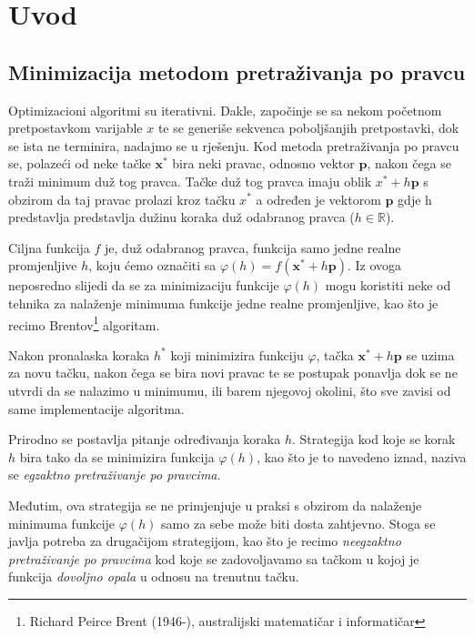 \documentclass[bosnian,12pt,a4paper]{report}
\begin{document}
\chapter{Uvod}
	\section{Minimizacija metodom pretraživanja po pravcu}
	
	\justify
	Optimizacioni algoritmi su iterativni. Dakle, započinje se sa nekom početnom pretpostavkom varijable $x$ te se generiše sekvenca poboljšanjih pretpostavki, dok se ista ne terminira, nadajmo se u rješenju. Kod metoda pretraživanja po pravcu se, polazeći od neke tačke $\textbf{x}^*$ bira neki pravac, odnosno vektor $\textbf{p}$, nakon čega se traži minimum duž tog pravca. 
	\justify
	Tačke duž tog pravca imaju oblik $x^* + h\textbf{p}$ s obzirom da taj pravac prolazi kroz tačku $x^*$ a određen je vektorom $\textbf{p}$ gdje h predstavlja predstavlja dužinu koraka duž odabranog pravca ($h \in \mathbb{R}$). 
	
	
	\justify
	Ciljna funkcija $f$ je, duž odabranog pravca, funkcija samo jedne realne promjenljive $h$, koju ćemo označiti sa $\varphi(h) = f(\textbf{x}^* + h\textbf{p})$. Iz ovoga neposredno slijedi da se za minimizaciju funkcije $\varphi(h)$ mogu koristiti neke od tehnika za nalaženje minimuma funkcije jedne realne promjenljive, kao što je recimo Brentov\footnote{Richard Peirce Brent (1946-), australijski matematičar i informatičar} algoritam. 
	
	\justify
	Nakon pronalaska koraka $h^*$ koji minimizira funkciju $\varphi$, tačka $\textbf{x}^* + h\textbf{p}$ se uzima za novu tačku, nakon čega se bira novi pravac te se postupak ponavlja dok se ne utvrdi da se nalazimo u minimumu, ili barem njegovoj okolini, što sve zavisi od same implementacije algoritma.
	
	
	\justify
	Prirodno se postavlja pitanje određivanja koraka $h$. Strategija kod koje se korak $h$ bira tako da se minimizira funkcija $\varphi(h)$, kao što je to navedeno iznad, naziva se \textit{egzaktno pretraživanje po pravcima}. 
	
	
	\justify
	Međutim, ova strategija se ne primjenjuje u praksi s obzirom da nalaženje minimuma funkcije $\varphi(h)$ samo za sebe može biti dosta zahtjevno. Stoga se javlja potreba za drugačijom strategijom, kao što je recimo \textit{neegzaktno pretraživanje po pravcima} kod koje se zadovoljavamo sa tačkom u kojoj je funkcija \textit{dovoljno opala} u odnosu na trenutnu tačku. 
	
\end{document}
